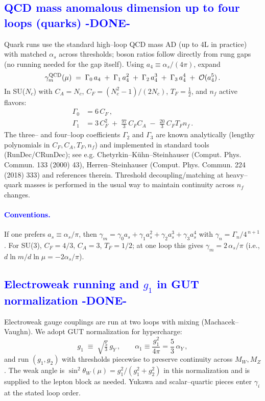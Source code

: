 \documentclass[%
 amsmath,amssymb,
 aps,
prb,
floatfix, showkeys
]{revtex4-2}
\newcommand{\modif}[1]{\textcolor{blue}{#1}}
\begin{document}
{\modif{
\subsection{QCD mass anomalous dimension up to four loops (quarks) -DONE-}    %
\label{subsec:qcd_ad}
}}
Quark runs use the standard high--loop QCD mass AD (up to 4L in practice)
with matched $\alpha_s$ across thresholds;
boson ratios follow directly from rung gaps (no running needed for the gap itself).
Using $a_4 \equiv \alpha_s/(4\pi)$, expand
\begin{equation}
  \gamma_{m}^{\rm QCD}(\mu) \;=\; \Gamma_0\,a_4 \;+\; \Gamma_1\,a_4^{2} \;+\; \Gamma_2\,a_4^{3} \;+\; \Gamma_3\,a_4^{4} \;+\; \mathcal{O}(a_4^{5})\,.
  \label{eq:qcd_gamma_general}
\end{equation}
In SU($N_c$) with $C_A=N_c$, $C_F=(N_c^2-1)/(2N_c)$, $T_F=\tfrac{1}{2}$, and $n_f$ active flavors:
\begin{align}
  \Gamma_0 &= 6\,C_F\,,\label{eq:qcd_G0}\\
  \Gamma_1 &= 3\,C_F^2 \;+\; \frac{97}{3}\,C_F C_A \;-\; \frac{20}{3}\,C_F T_F n_f\,.\label{eq:qcd_G1}
\end{align}
The three– and four–loop coefficients $\Gamma_2$ and $\Gamma_3$ are known analytically (lengthy polynomials in $C_F,C_A,T_F,n_f$) and implemented in standard tools (RunDec/CRunDec); see e.g. Chetyrkin–Kühn–Steinhauser (Comput. Phys. Commun. 133 (2000) 43), Herren–Steinhauser (Comput. Phys. Commun. 224 (2018) 333) and references therein. Threshold decoupling/matching at heavy–quark masses is performed in the usual way to maintain continuity across $n_f$ changes.

\paragraph{ {\modif{ Conventions.} }}
If one prefers $a_s\equiv\alpha_s/\pi$, then $\gamma_m = \gamma_0 a_s + \gamma_1 a_s^2 + \gamma_2 a_s^3 + \gamma_3 a_s^4$ with $\gamma_n=\Gamma_n/4^{\,n+1}$. For SU(3), $C_F=4/3$, $C_A=3$, $T_F=1/2$; at one loop this gives $\gamma_m=2\,\alpha_s/\pi$ (i.e., $d\ln m/d\ln\mu = -2\alpha_s/\pi$).




{\modif{
\subsection{Electroweak running and $g_1$ in GUT normalization -DONE-}   %
\label{subsec:ew_running}
}}
Electroweak gauge couplings are run at two loops with mixing (Machacek–Vaughn). We adopt GUT normalization for hypercharge:
\[
  g_1 \;\equiv\; \sqrt{\tfrac{5}{3}}\,g_Y\,,\qquad \alpha_1 \equiv \frac{g_1^2}{4\pi}=\frac{5}{3}\,\alpha_Y\,,
\]
and run $(g_1,g_2)$ with thresholds piecewise to preserve continuity across $M_W,M_Z$. The weak angle is $\sin^2\theta_W(\mu) = g_1^2/(g_1^2+g_2^2)$ in this normalization and is supplied to the lepton block as needed. Yukawa and scalar–quartic pieces enter $\gamma_i$ at the stated loop order.
\end{document}

